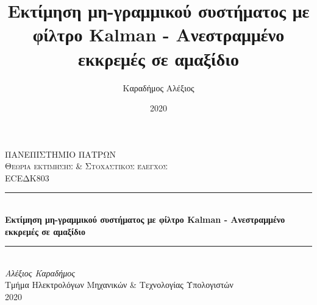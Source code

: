\documentclass[10pt]{article}
\title{Εκτίμηση μη-γραμμικού συστήματος με φίλτρο Kalman - Ανεστραμμένο εκκρεμές σε αμαξίδιο}
\author{Καραδήμος Αλέξιος}
\date{2020}
\begin{document}

\begin{titlepage}

\newcommand{\HRule}{\rule{\linewidth}{0.5mm}} %

\center %
 

\textsc{\LARGE ΠΑΝΕΠΙΣΤΗΜΙΟ ΠΑΤΡΩΝ}\\[1.5cm] %
\textsc{\Large Θεωρία εκτίμησης \& Στοχαστικός έλεγχος}\\[0.5cm] %
\textsc{\large \textlatin{ECE}ΔΚ803}\\[0.5cm] %


\HRule \\[0.4cm]
{ \huge \bfseries Εκτίμηση μη-γραμμικού συστήματος με φίλτρο Kalman - Ανεστραμμένο εκκρεμές σε αμαξίδιο}\\[0.4cm] %
\HRule \\[1.5cm]
 


\emph{Αλέξιος Καραδήμος}\\ %
Τμήμα Ηλεκτρολόγων Μηχανικών \& Τεχνολογίας Υπολογιστών\\[2cm]


{\large 2020}\\[1cm] %


\end{titlepage}
\end{document}
